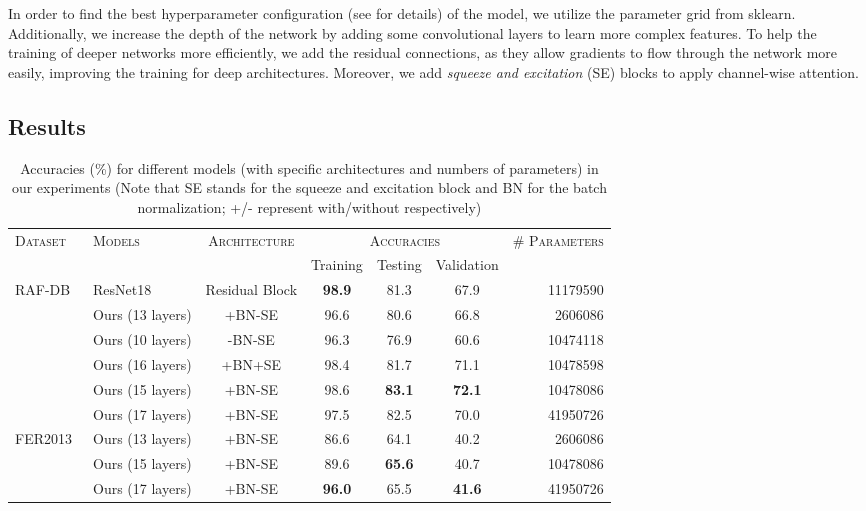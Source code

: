 In order to find the best hyperparameter configuration (see  for details) of the model, 
we utilize the parameter grid from sklearn.
Additionally, we increase the depth of the network by adding some convolutional layers to learn more complex features. 
To help the training of deeper networks more efficiently, 
we add the residual connections, 
as they allow gradients to flow through the network more easily, improving the training for deep architectures. 
Moreover, 
we add \textit{squeeze and excitation} (SE) blocks to apply channel-wise attention. 

\subsection{Results}
\label{sec:evaluation:results}

\begin{table*}[ht]
  \centering
  \begin{tabular}{@{}llccccr@{}}
    \toprule 
    \multirow{2}{*}{\textsc{Dataset}}&\multirow{2}{*}{\textsc{Models}}&\multirow{2}{*}{\textsc{Architecture}} & \multicolumn{3}{c}{\textsc{Accuracies}} & \multirow{2}{*}{\textsc{\# Parameters}} \\
    \cline{4-6}
    &&& Training & Testing & Validation  &  \\
    \midrule
    \multirow{6}{*}{RAF-DB~\cite{li_reliable_2017,li2019reliable}}     & ResNet18~\cite{HeZRS16} & Residual Block  & \textbf{98.9} & 81.3 & 67.9 & 11179590 \\
    &Ours (13 layers) & +BN-SE & 96.6 & 80.6 & 66.8 & 2606086 \\ 
    &Ours (10 layers) & -BN-SE & 96.3 & 76.9 & 60.6 & 10474118 \\
    &Ours (16 layers) & +BN+SE & 98.4 & 81.7 & 71.1 & 10478598 \\
    &Ours (15 layers) & +BN-SE & 98.6 & \textbf{83.1} & \textbf{72.1} & 10478086 \\
    &Ours (17 layers) & +BN-SE & 97.5 & 82.5 & 70.0 & 41950726 \\ 
    \midrule
    \multirow{3}{*}{FER2013~\cite{BarsoumZCZ16}} & Ours (13 layers) & +BN-SE & 86.6 & 64.1 & 40.2 & 2606086 \\
    &Ours (15 layers) & +BN-SE & 89.6 & \textbf{65.6} & 40.7 & 10478086 \\
    &Ours (17 layers) & +BN-SE & \textbf{96.0} & 65.5 & \textbf{41.6} & 41950726 \\
    \bottomrule
  \end{tabular}
  \caption{Accuracies (\%) for different models (with specific architectures and numbers of parameters) in our experiments 
  (Note that SE stands for the squeeze and excitation block and BN for the batch normalization; 
  +/- represent with/without respectively)}
  \label{tab:model}
\end{table*}

